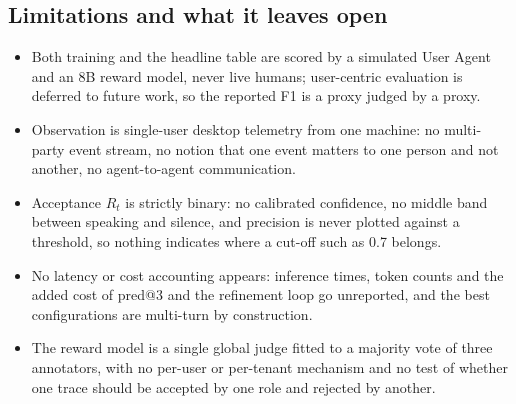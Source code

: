 \subsection{Limitations and what it leaves open}
\begin{itemize}[leftmargin=*, itemsep=1pt, topsep=2pt]
  \item Both training and the headline table are scored by a simulated User Agent and an 8B reward model, never live humans; user-centric evaluation is deferred to future work, so the reported F1 is a proxy judged by a proxy.
  \item Observation is single-user desktop telemetry from one machine: no multi-party event stream, no notion that one event matters to one person and not another, no agent-to-agent communication.
  \item Acceptance $R_t$ is strictly binary: no calibrated confidence, no middle band between speaking and silence, and precision is never plotted against a threshold, so nothing indicates where a cut-off such as 0.7 belongs.
  \item No latency or cost accounting appears: inference times, token counts and the added cost of pred@3 and the refinement loop go unreported, and the best configurations are multi-turn by construction.
  \item The reward model is a single global judge fitted to a majority vote of three annotators, with no per-user or per-tenant mechanism and no test of whether one trace should be accepted by one role and rejected by another.
\end{itemize}

